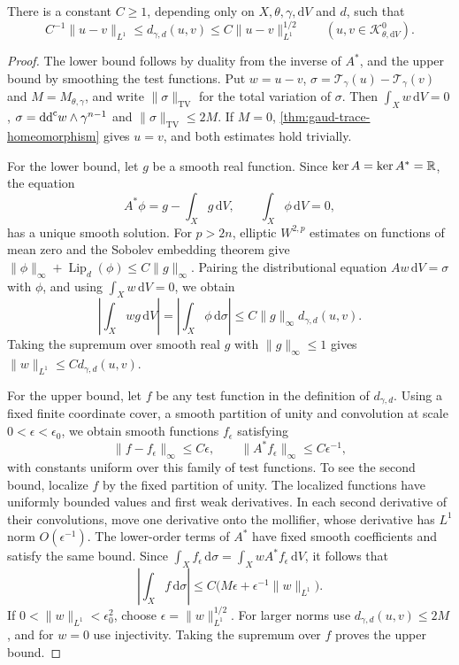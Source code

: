 \begin{proposition}\label{prop:gaud-trace-quantitative}
There is a constant $C\geq1$, depending only on $X,\theta,\gamma,\mathrm{d}V$ and $d$, such that
\[
 C^{-1}\|u-v\|_{L^1}
 \leq d_{\gamma,d}(u,v)
 \leq C\|u-v\|_{L^1}^{1/2}
 \qquad(u,v\in\mathcal K^0_{\theta,\mathrm{d}V}).
\]
\end{proposition}
\begin{proof}
The lower bound follows by duality from the inverse of $A^*$, and the upper bound by smoothing the test functions. Put $w=u-v$, $\sigma=\mathcal T_\gamma(u)-\mathcal T_\gamma(v)$ and $M=M_{\theta,\gamma}$, and write $\|\sigma\|_{\mathrm{TV}}$ for the total variation of $\sigma$. Then $\int_Xw\,\mathrm{d}V=0$, $\sigma=\mathrm{dd}^{\mathrm{c}} w\wedge\gamma^{n-1}$ and $\|\sigma\|_{\mathrm{TV}}\leq2M$. If $M=0$, \cref{thm:gaud-trace-homeomorphism} gives $u=v$, and both estimates hold trivially.

For the lower bound, let $g$ be a smooth real function. Since $\ker A=\ker A^*=\mathbb R$, the equation
\[
 A^*\phi=g-\int_Xg\,\mathrm{d}V,\qquad
 \int_X\phi\,\mathrm{d}V=0,
\]
has a unique smooth solution. For $p>2n$, elliptic $W^{2,p}$ estimates on functions of mean zero and the Sobolev embedding theorem give $\|\phi\|_\infty+\operatorname{Lip}_d(\phi)\leq C\|g\|_\infty$.
Pairing the distributional equation $Aw\,\mathrm{d}V=\sigma$ with $\phi$, and using $\int_Xw\,\mathrm{d}V=0$, we obtain
\[
 \left|\int_Xwg\,\mathrm{d}V\right|
 =\left|\int_X\phi\,\mathrm{d}\sigma\right|
 \leq C\|g\|_\infty d_{\gamma,d}(u,v).
\]
Taking the supremum over smooth real $g$ with $\|g\|_\infty\leq1$ gives $\|w\|_{L^1}\leq C d_{\gamma,d}(u,v)$.

For the upper bound, let $f$ be any test function in the definition of $d_{\gamma,d}$. Using a fixed finite coordinate cover, a smooth partition of unity and convolution at scale $0<\epsilon<\epsilon_0$, we obtain smooth functions $f_\epsilon$ satisfying
\[
 \|f-f_\epsilon\|_\infty\leq C\epsilon,
 \qquad \|A^*f_\epsilon\|_\infty\leq C\epsilon^{-1},
\]
with constants uniform over this family of test functions. To see the second bound, localize $f$ by the fixed partition of unity. The localized functions have uniformly bounded values and first weak derivatives. In each second derivative of their convolutions, move one derivative onto the mollifier, whose derivative has $L^1$ norm $O(\epsilon^{-1})$. The lower-order terms of $A^*$ have fixed smooth coefficients and satisfy the same bound. Since $\int_Xf_\epsilon\,\mathrm{d}\sigma=\int_XwA^*f_\epsilon\,\mathrm{d}V$, it follows that
\[
 \left|\int_Xf\,\mathrm{d}\sigma\right|
 \leq C\bigl(M\epsilon+\epsilon^{-1}\|w\|_{L^1}\bigr).
\]
If $0<\|w\|_{L^1}<\epsilon_0^2$, choose $\epsilon=\|w\|_{L^1}^{1/2}$. For larger norms use $d_{\gamma,d}(u,v)\leq2M$, and for $w=0$ use injectivity. Taking the supremum over $f$ proves the upper bound.
\end{proof}

